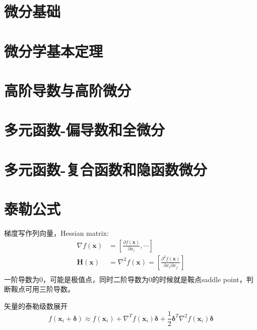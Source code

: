 \documentclass[UTF8]{../../09-Mathematics}
\begin{document}
\section{微分基础}


\section{微分学基本定理}



\section{高阶导数与高阶微分}








\section{多元函数-偏导数和全微分}

\section{多元函数-复合函数和隐函数微分}


\section{泰勒公式}




梯度写作列向量，Hessian matrix: 
\begin{equation}
\begin{aligned}
    \nabla f(\boldsymbol x)&= \left[\frac{\partial f(\boldsymbol x)}{\partial x_i},\cdots\right]\\
    \mathbf H (\boldsymbol x)&= \nabla ^2 f(\boldsymbol x)=\left[ \frac{\partial ^2 f(\boldsymbol x)}{\partial x_i \partial x_j} \right]\\
\end{aligned}
\end{equation}
 一阶导数为0，可能是极值点，同时二阶导数为0的时候就是鞍点saddle point，判断鞍点可用三阶导数。


矢量的泰勒级数展开
\begin{equation}
f(\mathbf x_i +\mathbf \delta) \approx f(\mathbf x_i)+
\nabla ^T f(\mathbf x_i) \mathbf \delta +
\frac{1}{2}\mathbf \delta ^T \nabla ^2 f(\mathbf x_i)\mathbf \delta
\end{equation}
\end{document}
